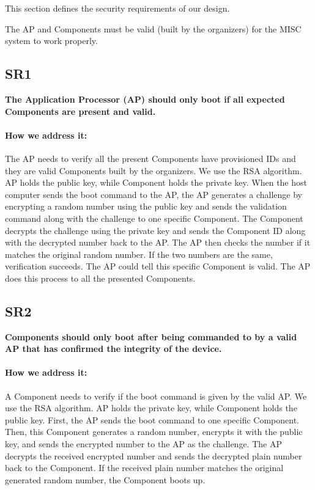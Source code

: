 \documentclass[11pt,oneside,onecolumn,letterpaper]{article}
\newcounter{alg}
\begin{document}
	This section defines the security requirements of our design.
	
	The AP and Components must be valid (built by the organizers) for the MISC system to work properly.
	
	\subsection{SR1}
	\textbf{The Application Processor (AP) should only boot if all expected Components are present and valid.}
	\paragraph{How we address it:}
	The AP needs to verify all the present Components have provisioned IDs and they are valid Components built by the organizers.
	We use the RSA algorithm.
	AP holds the public key,
	while Component holds the private key.
	When the host computer sends the boot command to the AP,
	the AP generates a challenge by encrypting a random number using the public key and sends the validation command along with the challenge to one specific Component.
	The Component decrypts the challenge using the private key and sends the Component ID along with the decrypted number back to the AP.
	The AP then checks the number if it matches the original random number.
	If the two numbers are the same,
	verification succeeds.
	The AP could tell this specific Component is valid.
	The AP does this process to all the presented Components.
	
	\subsection{SR2}
	\textbf{Components should only boot after being commanded to by a valid AP that has confirmed the integrity of the device.}
	\paragraph{How we address it:}
	A Component needs to verify if the boot command is given by the valid AP.
	We use the RSA algorithm.
	AP holds the private key,
	while Component holds the public key.
	First, the AP sends the boot command to one specific Component.
	Then,
	this Component generates a random number,
	encrypts it with the public key,
	and sends the encrypted number to the AP as the challenge.
	The AP decrypts the received encrypted number and sends the decrypted plain number back to the Component.
	If the received plain number matches the original generated random number,
	the Component boots up.
	
\end{document}
